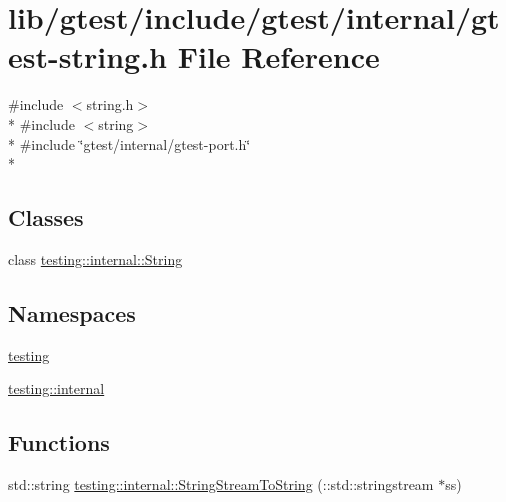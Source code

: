 \hypertarget{gtest-string_8h}{\section{lib/gtest/include/gtest/internal/gtest-\/string.h File Reference}
\label{gtest-string_8h}
}
{\ttfamily \#include $<$string.\-h$>$}\\*
{\ttfamily \#include $<$string$>$}\\*
{\ttfamily \#include \char`\"{}gtest/internal/gtest-\/port.\-h\char`\"{}}\\*
\subsection*{Classes}
\begin{DoxyCompactItemize}
\item 
class \hyperlink{classtesting_1_1internal_1_1_string}{testing\-::internal\-::\-String}
\end{DoxyCompactItemize}
\subsection*{Namespaces}
\begin{DoxyCompactItemize}
\item 
\hyperlink{namespacetesting}{testing}
\item 
\hyperlink{namespacetesting_1_1internal}{testing\-::internal}
\end{DoxyCompactItemize}
\subsection*{Functions}
\begin{DoxyCompactItemize}
\item 
std\-::string \hyperlink{namespacetesting_1_1internal_a1c063cdfa8269116167e71b477266381}{testing\-::internal\-::\-String\-Stream\-To\-String} (\-::std\-::stringstream $\ast$ss)
\end{DoxyCompactItemize}
